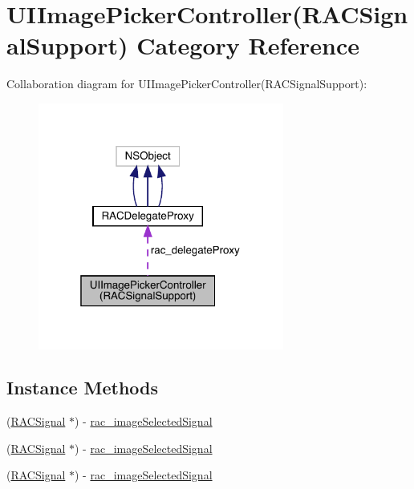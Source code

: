 \hypertarget{category_u_i_image_picker_controller_07_r_a_c_signal_support_08}{}\section{U\+I\+Image\+Picker\+Controller(R\+A\+C\+Signal\+Support) Category Reference}
\label{category_u_i_image_picker_controller_07_r_a_c_signal_support_08}


Collaboration diagram for U\+I\+Image\+Picker\+Controller(R\+A\+C\+Signal\+Support)\+:\nopagebreak
\begin{figure}[H]
\begin{center}
\leavevmode
\includegraphics[width=229pt]{category_u_i_image_picker_controller_07_r_a_c_signal_support_08__coll__graph}
\end{center}
\end{figure}
\subsection*{Instance Methods}
\begin{DoxyCompactItemize}
\item 
(\mbox{\hyperlink{interface_r_a_c_signal}{R\+A\+C\+Signal}} $\ast$) -\/ \mbox{\hyperlink{category_u_i_image_picker_controller_07_r_a_c_signal_support_08_ab9e581c9f1e505147acaae5b26c6be13}{rac\+\_\+image\+Selected\+Signal}}
\item 
(\mbox{\hyperlink{interface_r_a_c_signal}{R\+A\+C\+Signal}} $\ast$) -\/ \mbox{\hyperlink{category_u_i_image_picker_controller_07_r_a_c_signal_support_08_ab9e581c9f1e505147acaae5b26c6be13}{rac\+\_\+image\+Selected\+Signal}}
\item 
(\mbox{\hyperlink{interface_r_a_c_signal}{R\+A\+C\+Signal}} $\ast$) -\/ \mbox{\hyperlink{category_u_i_image_picker_controller_07_r_a_c_signal_support_08_ab9e581c9f1e505147acaae5b26c6be13}{rac\+\_\+image\+Selected\+Signal}}
\end{DoxyCompactItemize}
